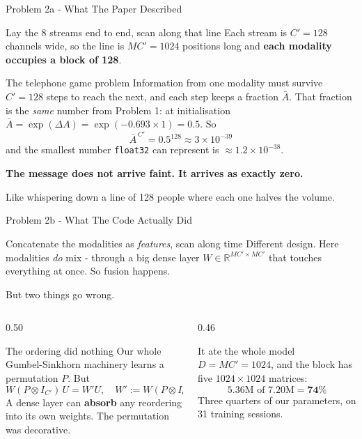 \documentclass[aspectratio=169]{beamer}
\newcommand{\hl}[1]{\textcolor{coolpurple}{\textbf{#1}}}
\newcommand{\R}{\mathbb{R}}
\begin{document}
	\begin{frame}{Problem 2a - What The Paper Described}
		\begin{block}{Lay the 8 streams end to end, scan along that line}
			\small
			Each stream is $C' = 128$ channels wide, so the line is $MC' = 1024$ positions long
			and \textbf{each modality occupies a block of 128}.
		\end{block}
		\begin{alertblock}{The telephone game problem}
			\small
			Information from one modality must survive $C' = 128$ steps to reach the next, and each
			step keeps a fraction $\bar{A}$. That fraction is the \emph{same} number from
			Problem 1: at initialisation $\bar{A} = \exp(\Delta A) = \exp(-0.693 \times 1) = 0.5$.
			So
			$$ \bar{A}^{\,C'} = 0.5^{128} \approx 3 \times 10^{-39} $$
			and the smallest number \texttt{float32} can represent is $\approx 1.2 \times 10^{-38}$.
			\vspace{0.2em}

			\hl{The message does not arrive faint. It arrives as exactly zero.}
		\end{alertblock}
		\vspace{0.2em}
		\centering\small
		Like whispering down a line of 128 people where each one halves the volume.
	\end{frame}

	\begin{frame}{Problem 2b - What The Code Actually Did}
		\begin{block}{Concatenate the modalities as \emph{features}, scan along time}
			\small
			Different design. Here modalities \emph{do} mix - through a big dense layer
			$W \in \R^{MC' \times MC'}$ that touches everything at once. So fusion happens.
			\vspace{0.3em}

			But two things go wrong.
		\end{block}
		\begin{columns}[onlytextwidth]
			\begin{column}{0.50\textwidth}
				\begin{alertblock}{The ordering did nothing}
					\small
					Our whole Gumbel-Sinkhorn machinery learns a permutation $P$. But
					$$ W(P \otimes I_{C'})\,U = W'U, \quad W' := W(P \otimes I_{C'}) $$
					A dense layer can \textbf{absorb} any reordering into its own weights.
					The permutation was decorative.
				\end{alertblock}
			\end{column}
			\begin{column}{0.46\textwidth}
				\begin{alertblock}{It ate the whole model}
					\small
					$D = MC' = 1024$, and the block has five $1024 \times 1024$ matrices:
					$$ 5.36\text{M of } 7.20\text{M} = \mathbf{74\%} $$
					Three quarters of our parameters, on 31 training sessions.
				\end{alertblock}
			\end{column}
		\end{columns}
	\end{frame}
\end{document}
